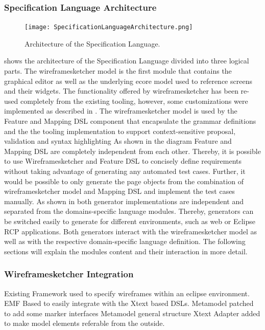 \documentclass{sig-alternate-05-2015}
\begin{document}
\subsubsection{Specification Language Architecture}
\begin{figure}[h]
	\centering
	\texttt{[image: SpecificationLanguageArchitecture.png]}
	\caption{Architecture of the Specification Language.}
	\label{fig:architectureOverview}
\end{figure}
 shows the architecture of the Specification Language divided into three logical parts. 
The wireframesketcher model is the first module that contains the graphical editor as well as the underlying ecore model used to reference screens and their widgets.
The functionality offered by wireframesketcher has been re-used completely from the existing tooling, however, some customizations were implemented as described in .
The wireframesketcher model is used by the Feature and Mapping DSL component that encapsulate the grammar definitions and the the tooling implementation to support context-sensitive proposal, validation and syntax highlighting
As shown in the diagram Feature and Mapping DSL are completely independent from each other.
Thereby, it is possible to use Wireframesketcher and Feature DSL to concisely define requirements without taking advantage of generating any automated test cases.
Further, it would be possible to only generate the page objects from the combination of wireframesketcher model and Mapping DSL and implement the test cases manually.
As shown in  both generator implementations are independent and separated from the domains-specific language modules.
Thereby, generators can be switched easily to generate for different environments, such as web or Eclipse RCP applications.
Both generators interact with the wireframesketcher model as well as with the respective domain-specific language definition.
The following sections will explain the modules content and their interaction in more detail.

\subsubsection{Wireframesketcher Integration}\label{sec:WireframesketcherIntegration} 
Existing Framework used to specify wireframes within an eclipse environment.
EMF Based to easily integrate with the Xtext based DSLs.
Metamodel patched to add some marker interfaces
Metamodel general structure
Xtext Adapter added to make model elements referable from the outside.
\end{document}
